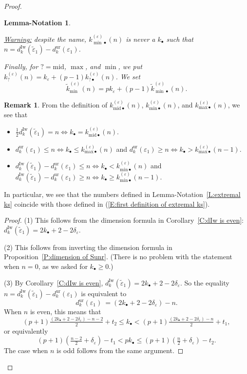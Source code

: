 \documentclass[12pt]{amsart}
\newtheorem{lemmanotation}[subsection]{Lemma-Notation}
\theoremstyle{definition}
\newtheorem{remark}[subsection]{Remark}
\numberwithin{equation}{subsection}
\newcommand{\Iw}{\mathrm{Iw}}
\newcommand{\unr}{\mathrm{ur}}
\newcommand{\ur}{\mathrm{ur}}
\newcommand{\midd}{\mathrm{mid}}
\begin{document}
\begin{proof}
\begin{lemmanotation}
\begin{enumerate}
\emph{\underline{Warning:} despite the name, $k_{{\min}\bullet}^{(\varepsilon)}(n)$ is never  a $k_\bullet$ such that $n = d_{k}^\Iw(\tilde \varepsilon_1) - d_{k}^\unr(\varepsilon_1)$.}
\end{enumerate}
Finally, for %
$? = \midd$, $\max$, and $\min$, we put $k_?^{(\varepsilon)}(n) = k_\varepsilon + (p-1)k_{?\bullet}^{(\varepsilon)}(n)$. We set
$$\tilde k_{{\min}}^{(\varepsilon)}(n)  = pk_\varepsilon + (p-1)\tilde k_{{\min}\bullet}^{(\varepsilon)}(n).
$$
\end{lemmanotation}
\begin{remark}
\label{R:meaning of kmidminmax}
From the definition of $k_{\mathrm{mid}\bullet}^{(\varepsilon)}(n)$, $k_{\mathrm{min}\bullet}^{(\varepsilon)}(n)$, and $k^{(\varepsilon)}_{\mathrm{max} \bullet}(n)$, we see that
\begin{itemize}
\item $\frac 12d_k^\Iw(\tilde \varepsilon_1) = n \Leftrightarrow k_\bullet = k_{\mathrm{mid}\bullet}^{(\varepsilon)}(n)$.
\item $d_k^\ur(\varepsilon_1) \leq  n \Leftrightarrow k_\bullet \leq k_{\mathrm{max}\bullet}^{(\varepsilon)}(n)$ and $d_k^\ur(\varepsilon_1) \geq   n \Leftrightarrow k_\bullet > k_{\mathrm{max}\bullet}^{(\varepsilon)}(n-1)$.
\item 
$d_k^\Iw(\tilde \varepsilon_1) - d_k^\ur(\varepsilon_1) \leq  n \Leftrightarrow k_\bullet < k_{\mathrm{min}\bullet}^{(\varepsilon)}(n)$ and $d_k^\Iw(\tilde \varepsilon_1) -d_k^\ur(\varepsilon_1) \geq   n \Leftrightarrow k_\bullet \geq k_{\mathrm{min}\bullet}^{(\varepsilon)}(n-1)$.
\end{itemize}
In particular, we see that the numbers defined in Lemma-Notation~\ref{L:extremal ks} coincide with those defined in (\ref{E:first definition of extremal ks}).
\end{remark}
\begin{proof}
(1) This follows from the dimension formula in Corollary~\ref{C:dIw is even}: $d_{k}^{\Iw}(\tilde \varepsilon_1) = 2k_\bullet + 2-2\delta_\varepsilon$.

(2) This follows from inverting the dimension formula in Proposition~\ref{P:dimension of Sunr}. (There is no problem with the statement when $n=0$, as we asked for $k_\bullet \geq 0$.)


(3) By Corollary~\ref{C:dIw is even}, $d_{k}^{\Iw}(\tilde \varepsilon_1) = 2k_\bullet + 2-2\delta_\varepsilon$. So the equality $n = d_{k}^\Iw(\tilde \varepsilon_1)-d_{k}^\unr(\varepsilon_1)$ is equivalent to
$$
d_{k}^\unr(\varepsilon_1)\ =  (2k_\bullet+2-2\delta_\varepsilon)-n.
$$
When $n$ is even, this means that
$$(p+1)\tfrac { (2k_\bullet+2-2\delta_\varepsilon)-n-2}2 + t_2 \leq k_\bullet  < (p+1)\tfrac {(2k_\bullet+2-2\delta_\varepsilon)-n}2 + t_1,
$$
or equivalently
$$ (p+1)( \tfrac {n-2}2 + \delta_\varepsilon) -t_1 < pk_\bullet  \leq (p+1)( \tfrac n2 + \delta_\varepsilon)  -t_2.
$$
The case when $n$ is odd follows from the same argument.
\end{proof}


\end{proof}
\end{document}
